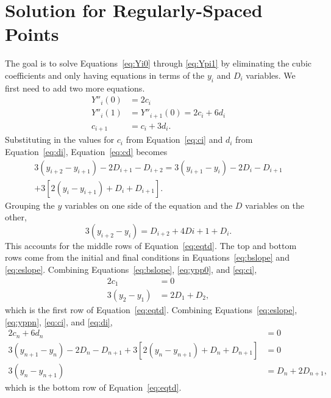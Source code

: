 \documentclass{scrartcl}
\begin{document}
\section{Solution for Regularly-Spaced Points}\label{sec:reg-deriv}
The goal is to solve Equations~\ref{eq:Yi0} through \ref{eq:Ypi1}
by eliminating the cubic coefficients and only having equations
in terms of the $y_i$ and $D_i$ variables. We first need to
add two more equations.
\begin{align}
Y''_i(0) &= 2c_i\label{eq:ypp0}\\
Y''_i(1) &= Y''_{i+1}(0) = 2c_i+6d_i\label{eq:yppn}\\
c_{i+1} &= c_i + 3d_i. \label{eq:cd}
\end{align}
Substituting in the values for $c_i$ from Equation~\ref{eq:ci} and
$d_i$ from Equation~\ref{eq:di}, Equation~\ref{eq:cd} becomes
\begin{multline}
3(y_{i+2}-y_{i+1})-2D_{i+1}-D_{i+2} = 3(y_{i+1}-y_i)-2D_i-D_{i+1}\\
	+3[2(y_i-y_{i+1})+D_i+D_{i+1}].
\end{multline}
Grouping the $y$ variables on one side of the equation and the $D$
variables on the other,
\begin{equation}
3(y_{i+2}-y_i) = D_{i+2} +4D{i+1} +D_i.
\end{equation}
This accounts for the middle rows of Equation~\ref{eq:eqtd}. The
top and bottom rows come from the initial and final conditions
in Equations~\ref{eq:bslope} and \ref{eq:eslope}. Combining
Equations~\ref{eq:bslope}, \ref{eq:ypp0}, and \ref{eq:ci},
\begin{align}
2c_1 & = 0\\
3(y_2-y_1) &= 2D_1 + D_2,
\end{align}
which is the first row of Equation~\ref{eq:eqtd}. Combining
Equations~\ref{eq:eslope}, \ref{eq:yppn}, \ref{eq:ci}, and
\ref{eq:di},
\begin{align}
2c_n+6d_n &= 0\\
3(y_{n+1}-y_n)-2D_n-D_{n+1}+3[2(y_n-y_{n+1})+D_n+D_{n+1}] &= 0\\
3(y_n-y_{n+1}) &= D_n+2D_{n+1},
\end{align}
which is the bottom row of Equation~\ref{eq:eqtd}.
\end{document}
